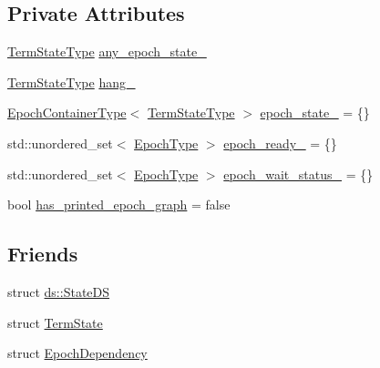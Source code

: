 \subsection*{Private Attributes}
\begin{DoxyCompactItemize}
\item 
\hyperlink{structvt_1_1term_1_1_term_action_ae4c635b69751d887666814700ed64d65}{Term\+State\+Type} \hyperlink{structvt_1_1term_1_1_termination_detector_a49337963d174e5be73fcf467304428a6}{any\+\_\+epoch\+\_\+state\+\_\+}
\item 
\hyperlink{structvt_1_1term_1_1_term_action_ae4c635b69751d887666814700ed64d65}{Term\+State\+Type} \hyperlink{structvt_1_1term_1_1_termination_detector_a5f873fb4a66c8364ec7859bbc608fe55}{hang\+\_\+}
\item 
\hyperlink{structvt_1_1term_1_1_termination_detector_a69e2615b61e072977463eea5b20b7933}{Epoch\+Container\+Type}$<$ \hyperlink{structvt_1_1term_1_1_term_action_ae4c635b69751d887666814700ed64d65}{Term\+State\+Type} $>$ \hyperlink{structvt_1_1term_1_1_termination_detector_a0c55ef5345253002f9de6e5c4337c53a}{epoch\+\_\+state\+\_\+} = \{\}
\item 
std\+::unordered\+\_\+set$<$ \hyperlink{namespacevt_a81d11b28122d43bf9834577e4a06440f}{Epoch\+Type} $>$ \hyperlink{structvt_1_1term_1_1_termination_detector_a22c7c6cc9c6cd48b5570dbae226a56f3}{epoch\+\_\+ready\+\_\+} = \{\}
\item 
std\+::unordered\+\_\+set$<$ \hyperlink{namespacevt_a81d11b28122d43bf9834577e4a06440f}{Epoch\+Type} $>$ \hyperlink{structvt_1_1term_1_1_termination_detector_a95cdb85a87fcf162725bc6515b43a002}{epoch\+\_\+wait\+\_\+status\+\_\+} = \{\}
\item 
bool \hyperlink{structvt_1_1term_1_1_termination_detector_a68afeac40869ccc50882f717106b382f}{has\+\_\+printed\+\_\+epoch\+\_\+graph} = false
\end{DoxyCompactItemize}
\subsection*{Friends}
\begin{DoxyCompactItemize}
\item 
struct \hyperlink{structvt_1_1term_1_1_termination_detector_a9c0b991de134b4bc5bebf051bd067b9f}{ds\+::\+State\+DS}
\item 
struct \hyperlink{structvt_1_1term_1_1_termination_detector_a628421bb882cfbd05876660b5b7dc150}{Term\+State}
\item 
struct \hyperlink{structvt_1_1term_1_1_termination_detector_aee175d34803c93c65e4323ab28f04088}{Epoch\+Dependency}
\end{DoxyCompactItemize}
